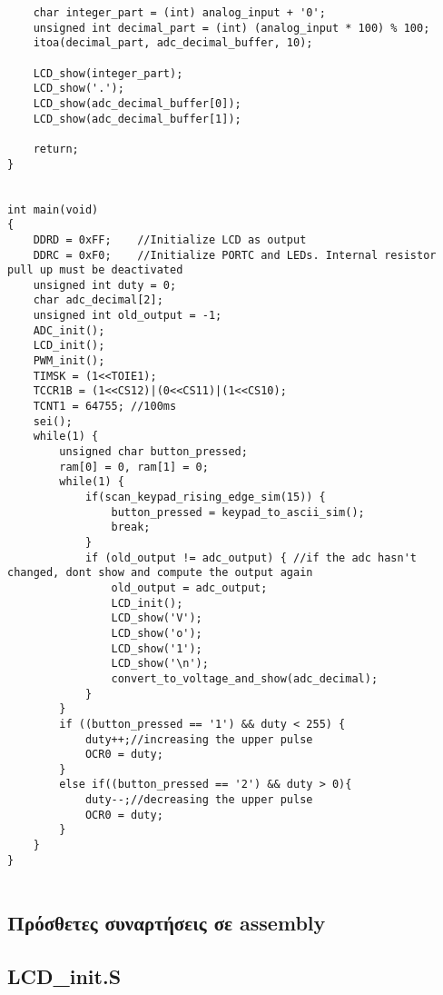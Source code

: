 \documentclass[11pt]{article}
\begin{document}
\begin{verbatim}
	char integer_part = (int) analog_input + '0';
	unsigned int decimal_part = (int) (analog_input * 100) % 100;
	itoa(decimal_part, adc_decimal_buffer, 10);
	
	LCD_show(integer_part);
	LCD_show('.');
	LCD_show(adc_decimal_buffer[0]);
	LCD_show(adc_decimal_buffer[1]);
	
	return;
}


int main(void)
{
	DDRD = 0xFF;	//Initialize LCD as output
	DDRC = 0xF0;	//Initialize PORTC and LEDs. Internal resistor pull up must be deactivated
	unsigned int duty = 0;
	char adc_decimal[2];
	unsigned int old_output = -1;
	ADC_init();
	LCD_init();
	PWM_init();
	TIMSK = (1<<TOIE1);
	TCCR1B = (1<<CS12)|(0<<CS11)|(1<<CS10);
	TCNT1 = 64755; //100ms
	sei();
	while(1) {
		unsigned char button_pressed;
		ram[0] = 0, ram[1] = 0;
		while(1) {
			if(scan_keypad_rising_edge_sim(15)) {
				button_pressed = keypad_to_ascii_sim();
				break;
			}
			if (old_output != adc_output) { //if the adc hasn't changed, dont show and compute the output again
				old_output = adc_output;
				LCD_init();
				LCD_show('V');
				LCD_show('o');
				LCD_show('1');
				LCD_show('\n');
				convert_to_voltage_and_show(adc_decimal);
			}
		}
		if ((button_pressed == '1') && duty < 255) {
			duty++;//increasing the upper pulse
			OCR0 = duty;
		}
		else if((button_pressed == '2') && duty > 0){
			duty--;//decreasing the upper pulse
			OCR0 = duty;
		}
	}
}


\end{verbatim}



\subsection*{Πρόσθετες συναρτήσεις σε assembly}

\subsection*{LCD\_init.S}
\end{document}
